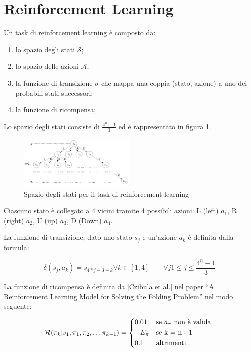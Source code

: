 \documentclass[conference]{IEEEtran}
\begin{document}
\section{Reinforcement Learning}

Un task di reinforcement learning è composto da:

\begin{enumerate}
 \item lo spazio degli stati $\mathcal{S}$;
 \item lo spazio delle azioni $\mathcal{A}$;
 \item la funzione di transizione $\sigma$ che mappa una coppia (stato, azione) a uno dei probabili stati successori;
 \item la funzione di ricompensa;
\end{enumerate}

Lo spazio degli stati consiste di $\frac{4^n - 1}{3}$ ed è rappresentato in figura \ref{fig:stateSpace}.

\begin{figure}[h]
\centering
\includegraphics[width=0.5\textwidth]{figure/stateSpace.png}
\caption{Spazio degli stati per il task di reinforcement learning}
\label{fig:stateSpace}
\end{figure}

Ciascuno stato è collegato a 4 vicini tramite 4 possibili azioni: L (left) $a_1$, R (right) $a_2$, U (up) $a_3$, D (Down) $a_4$.

La funzione di transizione, dato uno stato $s_j$ e un'azione $a_k$ è definita dalla formula:

\begin{equation}
\delta(s_j, a_k) = s_{4*j - 3 + k} \forall k \in [1,4] \qquad \forall j 1 \leq j \leq \frac{4^n - 1}{3}
\end{equation}

La funzione di ricompensa è definita da [Czibula et al.] nel paper ``A Reinforcement Learning Model for Solving the Folding Problem'' nel modo seguente:

\begin{equation}
    \mathcal{R}(\pi_k| s_1, \pi_1, \pi_2, \dots \pi_{k-1}) =
    \begin{cases*}
      0.01 & se $a_{\pi}$ non è valida \\
      - E_{\pi} & se k = n - 1 \\
      0.1 & altrimenti
    \end{cases*}
\end{equation}
\end{document}
